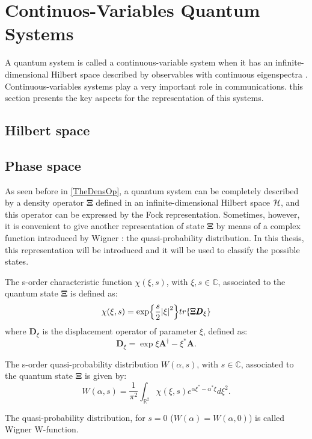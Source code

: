 \section{Continuos-Variables Quantum Systems}
    A quantum system is called a continuous-variable system
    when it has an infinite-dimensional Hilbert space described
    by observables with continuous eigenspectra \cite{ContinuousVar}.
    Continuous-variables systems play a very important role in communications. this
    section presents the key aspects for the representation of this systems.
            
    \subsection{Hilbert space}
        
    \subsection{Phase space}
        As seen before in \ref{TheDensOp}, a quantum system can be completely
        described by a density operator $\pmb{\Xi}$ defined in an infinite-dimensional Hilbert space
        $\mathcal{H}$, and this operator can be expressed by the Fock representation. %
        Sometimes, however, it is convenient to give another representation of state $\pmb{\Xi}$ by
        means of a complex function introduced by Wigner \cite{Wigner}: the quasi-probability 
        distribution. In this thesis, this representation will be introduced and it will be used to
        classify the possible states.

        \begin{definition}
            The s-order characteristic function $\mathcal{\chi}(\xi,s)$, with $\xi,s\in\mathbb{C}$,
            associated to the quantum state $\pmb{\Xi}$ is defined as:
            \begin{equation}
                \mathcal{\chi}(\xi,s)=\exp{\frac{s}{2}\absolutevalue{\xi}^2}
                tr\{\pmb{\Xi}\pmb{D}_\xi\}
            \end{equation}
            where $\pmb{D}_\xi$ is  the displacement operator of parameter $\xi$, defined as:
            \begin{equation}
                \pmb{D}_\xi=\exp{\xi\pmb{A}^\dagger-\xi^*\pmb{A}}.
            \end{equation}
        \end{definition}
        \begin{definition}
            The s-order quasi-probability distribution $W(\alpha,s)$, with $s\in\mathbb{C}$,
            associated to the quantum state $\mathbf{\Xi}$ is given by:
            \begin{equation*}
                W(\alpha,s)=\frac{1}{\pi^2}\int_{\mathbb{R}^2} 
                \mathcal{\chi}(\xi,s)e^{\alpha\xi^*-\alpha^*\xi}d\xi^2.
            \end{equation*}

        \end{definition}
        The quasi-probability distribution, for $s=0$ ($W(\alpha)=W(\alpha,0)$) is called 
        Wigner W-function.